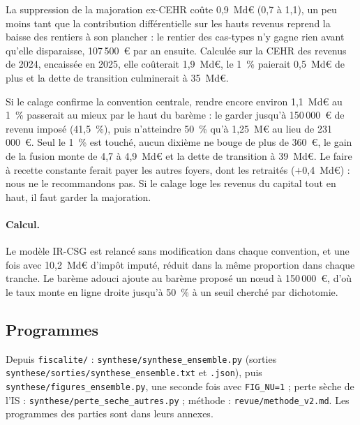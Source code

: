 La suppression de la majoration ex-CEHR coûte 0,9~Md€ (0,7 à 1,1), un peu moins tant que la contribution
différentielle sur les hauts revenus reprend la baisse des rentiers à son plancher : le rentier des cas-types n'y gagne
rien avant qu'elle disparaisse, 107\,500~€ par an ensuite. Calculée sur la CEHR des revenus de 2024, encaissée en
2025, elle coûterait 1,9~Md€, le 1~\% paierait 0,5~Md€ de plus et la dette de transition culminerait à 35~Md€.

Si le calage confirme la convention centrale, rendre encore environ 1,1~Md€ au 1~\% passerait au mieux par le haut du
barème : le garder jusqu'à 150\,000~€ de revenu imposé (41,5~\%), puis n'atteindre 50~\% qu'à 1,25~M€ au lieu de
231\,000~€. Seul le 1~\% est touché, aucun dixième ne bouge de plus de 360~€, le gain de la fusion monte de 4,7 à
4,9~Md€ et la dette de transition à 39~Md€. Le faire à recette constante ferait payer les autres foyers, dont les
retraités ($+$0,4~Md€) : nous ne le recommandons pas. Si le calage loge les revenus du capital tout en haut, il faut
garder la majoration.

\paragraph{Calcul.} Le modèle IR-CSG est relancé sans modification dans chaque convention, et une fois avec 10,2~Md€
d'impôt imputé, réduit dans la même proportion dans chaque tranche. Le barème adouci ajoute au barème proposé un nœud à
150\,000~€, d'où le taux monte en ligne droite jusqu'à 50~\% à un seuil cherché par dichotomie.

\subsection{Programmes}\label{ann:meth_programmes}

{\small\raggedright Depuis \texttt{fiscalite/} : \texttt{synthese/synthese\_ensemble.py} (sorties
\texttt{synthese/sorties/synthese\_ensemble.txt} et \texttt{.json}), puis \texttt{synthese/figures\_ensemble.py}, une
seconde fois avec \texttt{FIG\_NU=1} ; perte sèche de l'IS : \texttt{synthese/perte\_seche\_autres.py} ; méthode :
\texttt{revue/methode\_v2.md}. Les programmes des parties sont dans leurs annexes.\par}
